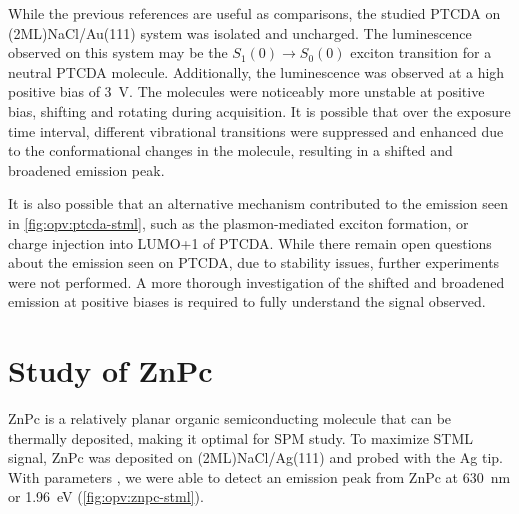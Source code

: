 While the previous references are useful as comparisons, the studied PTCDA on (2ML)NaCl/Au(111) system was isolated and uncharged. The luminescence observed on this system may be the $S_1(0) \rightarrow S_0(0)$ exciton transition for a neutral PTCDA molecule. Additionally, the luminescence was observed at a high positive bias of \SI{3}{V}. The molecules were noticeably more unstable at positive bias, shifting and rotating during acquisition. It is possible that over the exposure time interval, different vibrational transitions were suppressed and enhanced due to the conformational changes in the molecule, resulting in a shifted and broadened emission peak. 

It is also possible that an alternative mechanism contributed to the emission seen in \autoref{fig:opv:ptcda-stml}, such as the plasmon-mediated exciton formation, or charge injection into LUMO+1 of PTCDA. While there remain open questions about the emission seen on PTCDA, due to stability issues, further experiments were not performed. A more thorough investigation of the shifted and broadened emission at positive biases is required to fully understand the signal observed.



\section{Study of {ZnPc}}

\ac{ZnPc} is a relatively planar organic semiconducting molecule that can be thermally deposited, making it optimal for \ac{SPM} study. To maximize \ac{STML} signal, ZnPc was deposited on (2ML)NaCl/Ag(111) and probed with the Ag tip. With parameters , we were able to detect an emission peak from ZnPc at \SI{630}{nm} or \SI{1.96}{eV} (\autoref{fig:opv:znpc-stml}).




